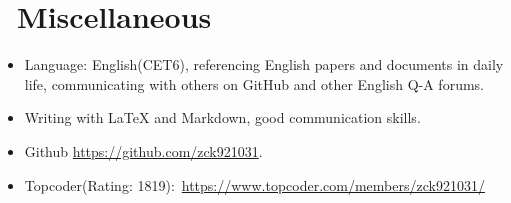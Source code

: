 \documentclass{resume}
\begin{document}
\section{\faInfo\ Miscellaneous}
\begin{itemize}[parsep=0.5ex]
  \item Language: English(CET6), referencing English papers and documents in daily life, communicating with others on GitHub and other English Q-A forums.
  \item Writing with LaTeX and Markdown, good communication skills.
  \item \faGithub Github \href{https://github.com/zck921031}{https://github.com/zck921031}.
  \item Topcoder(Rating: 1819):\  \href{https://www.topcoder.com/members/zck921031/}{https://www.topcoder.com/members/zck921031/}
\end{itemize}

%
%
\end{document}
